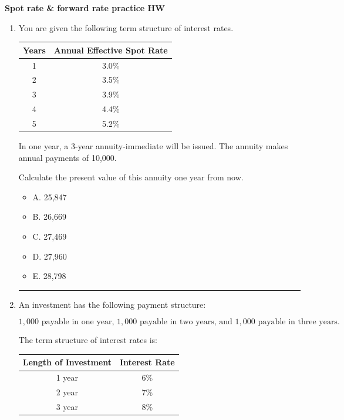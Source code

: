 \documentclass[11pt]{article}
\begin{document}
\begin{center}
{\Large \textbf{Spot rate \& forward rate practice HW}}\\
\vspace{0.3em}
\end{center}

\begin{enumerate}[label=\textbf{\arabic*.}]


\item You are given the following term structure of interest rates.

\begin{center}
\begin{tabular}{cc}
\toprule
Years & Annual Effective Spot Rate \\
\midrule
1 & 3.0\% \\
2 & 3.5\% \\
3 & 3.9\% \\
4 & 4.4\% \\
5 & 5.2\% \\
\bottomrule
\end{tabular}
\end{center}

In one year, a 3-year annuity-immediate will be issued. The annuity makes annual payments of 10,000.

Calculate the present value of this annuity one year from now.

\begin{itemize}
\item A. 25,847
\item B. 26,669
\item C. 27,469
\item D. 27,960
\item E. 28,798
\end{itemize}

\medskip
\hrule
\medskip


\item An investment has the following payment structure:

\[
1{,}000 \text{ payable in one year, } 1{,}000 \text{ payable in two years, and } 1{,}000 \text{ payable in three years.}
\]

The term structure of interest rates is:

\begin{center}
\begin{tabular}{cc}
\toprule
Length of Investment & Interest Rate \\
\midrule
1 year & 6\% \\
2 year & 7\% \\
3 year & 8\% \\
\bottomrule
\end{tabular}
\end{center}


\end{enumerate}
\end{document}
